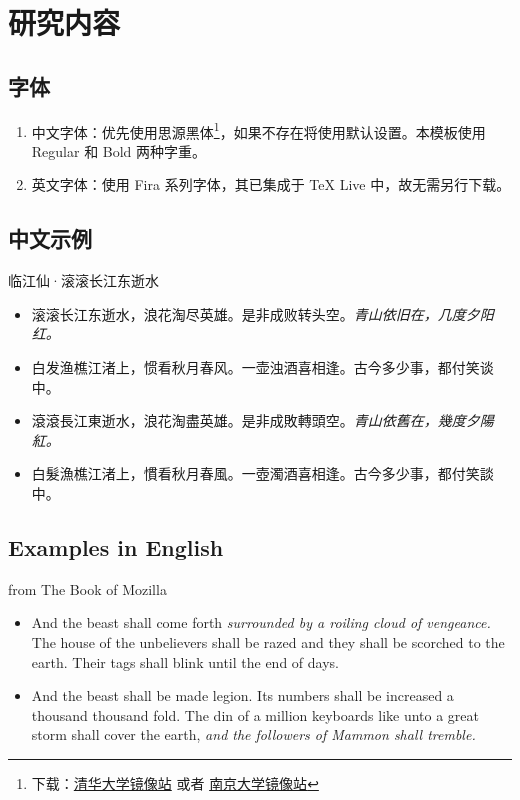 \documentclass[no-math]{ctexbeamer}
\begin{document}
\section{研究内容}

\subsection{字体}
\begin{frame}
    \begin{enumerate}
        \item 中文字体：优先使用思源黑体\footnote{下载：\href{https://mirrors.tuna.tsinghua.edu.cn/adobe-fonts/source-han-sans/OTF/SimplifiedChinese/}{清华大学镜像站} 或者 \href{https://mirror.nju.edu.cn/adobe-fonts/source-han-sans/OTF/SimplifiedChinese/}{南京大学镜像站}}，如果不存在将使用默认设置。本模板使用 Regular 和 Bold 两种字重。
        \item 英文字体：使用 Fira 系列字体，其已集成于 TeX Live 中，故无需另行下载。
    \end{enumerate}
\end{frame}

\subsection{中文示例}

\begin{frame}{临江仙·滚滚长江东逝水}
    \begin{itemize}
        \item 滚滚长江东逝水，浪花淘尽英雄。是非成败转头空。\emph{青山依旧在，几度夕阳红。}
        \item 白发渔樵江渚上，惯看秋月春风。一壶浊酒喜相逢。古今多少事，都付笑谈中。
        \item 滾滾長江東逝水，浪花淘盡英雄。是非成敗轉頭空。\emph{青山依舊在，幾度夕陽紅。}
        \item 白髮漁樵江渚上，慣看秋月春風。一壺濁酒喜相逢。古今多少事，都付笑談中。
    \end{itemize}
\end{frame}

\subsection{Examples in English}

\begin{frame}{from The Book of Mozilla}
    \begin{itemize}
        \item And the beast shall come forth \emph{surrounded by a roiling cloud of vengeance.} The house of the unbelievers shall be razed and they shall be scorched to the earth. Their tags shall blink until the end of days.
        \item And the beast shall be made legion. Its numbers shall be increased a thousand thousand fold. The din of a million keyboards like unto a great storm shall cover the earth, \textit{and the followers of Mammon shall tremble.}
    \end{itemize}
\end{frame}
\end{document}
